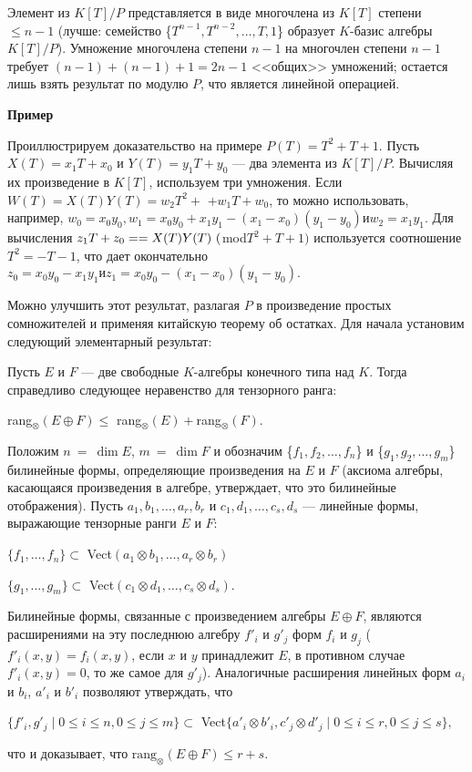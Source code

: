 \documentclass{mai_book}
\renewcommand{\le}{\leqslant}
\begin{document}
\begin{myproof}
  Элемент из $K[T]/P$ представляется в виде многочлена из $K[T]$ степени $\le n-1$ (лучше: семейство \{$T^{n-1},T^{n-2},\ldots,T,1$\} образует $K$-базис алгебры $K[T]/P$). Умножение многочлена степени $n-1$ на многочлен степени $n-1$ требует $(n-1)+(n-1)+1=2n-1$ <<общих>> умножений; остается лишь взять результат по модулю $P$, что является линейной операцией.
  \end{myproof}
\begin{beznomera}
  \textbf{Пример}
  \end{beznomera}
Проиллюстрируем доказательство на примере $P(T)=T^2+T+1.$ Пусть $X(T)=x_1T+x_0$ и $Y(T)=y_1T+y_0$ --- два элемента из $K[T]/P$. Вычисляя их произведение в $K[T]$, используем три умножения. Если $W(T)=X(T)Y(T)=w_2T^2+$ $+w_1T+w_0$, то можно использовать, например, $w_0=x_0y_0, w_1=x_0y_0+x_1y_1-(x_1-x_0)(y_1-y_0) и w_2=x_1y_1.$ Для вычисления $z_1T+z_0=\linebreak=X(T)Y(T)\ ($mod$T^2+T+1)$ используется соотношение $T^2=-T-1$, что дает окончательно $z_0=x_0y_0-x_1y_1 и z_1=x_0y_0-(x_1-x_0)(y_1-y_0).$\par
Можно улучшить этот результат, разлагая $P$ в произведение простых сомножителей и применяя китайскую теорему об остатках. Для начала установим следующий элементарный результат:
\begin{predl}
  Пусть $E$ и $F$ --- две свободные $K$-алгебры конечного типа над $K$. Тогда справедливо следующее неравенство для тензорного ранга:
  \begin{center}
    \textup{rang}$_{\otimes}(E \oplus F) \le $ \textup{rang}$_{\otimes}(E)+ $\textup{rang}$_{\otimes}(F).$
    \end{center}
\end{predl}
\begin{myproof}
  Положим $n\ =\ \dim E$, $m\ =\ \dim F$ и обозначим \{$f_1,f_2,\ldots,f_n$\} и \{$g_1,g_2,\ldots,g_m$\} билинейные формы, определяющие произведения на $E$ и $F$ (аксиома алгебры, касающаяся произведения в алгебре, утверждает, что это билинейные отображения). Пусть $a_1,b_1,\ldots,a_r,b_r$ и $c_1,d_1,\ldots,c_s,d_s$ --- линейные формы, выражающие тензорные ранги $E$ и $F$:
  \begin{center}
$\{f_1,\ldots,f_n\} \subset$ Vect$(a_1 \otimes b_1,\ldots,a_r \otimes b_r)$\par
    $\{g_1,\ldots,g_m\} \subset$ Vect$(c_1 \otimes d_1,\ldots,c_s \otimes d_s).$
\end{center}
    \noindent
    Билинейные формы, связанные с произведением алгебры $E \oplus F$, являются расширениями на эту последнюю алгебру $f'_i$ и $g'_j$ форм $f_i$ и $g_j$ ($f'_i(x,y) = f_i(x,y)$, если $x$ и $y$ принадлежит $E$, в противном случае $f'_i(x,y) = 0$, то же самое для $g'_j$). Аналогичные расширения линейных форм $a_i$ и $b_i$, $a'_i$ и $b'_i$ позволяют утверждать, что
    \begin{center}
$\{f'_i,g'_j \mid 0 \le i \le n, 0 \le j \le m\} \subset $ Vect$\{a'_i \otimes b'_i, c'_j \otimes d'_j \mid 0 \le i \le r, 0 \le j \le s\},$      \end{center}
        \noindent
что и доказывает, что $\text{rang}_{\otimes}(E \oplus F) \le r + s$.
\end{myproof}
\end{document}

